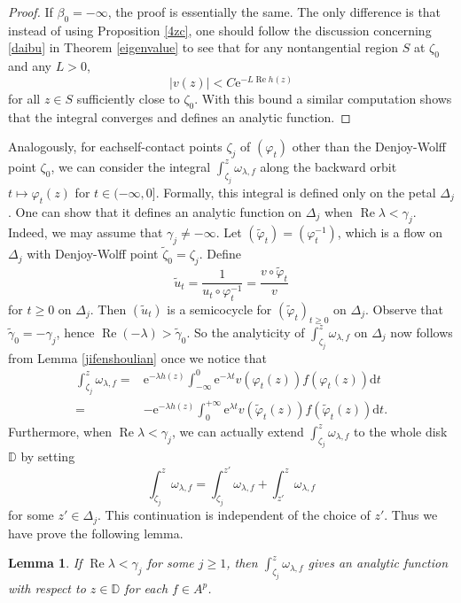 \documentclass{amsart}
\theoremstyle{proclaim}
\newtheorem{lemma}[theorem]{Lemma}
\theoremstyle{fancyproclaim}
\theoremstyle{definition}
\theoremstyle{fancystatement}
\numberwithin{equation}{section}
\begin{document}
\begin{proof}
If $\beta_0=-\infty$, the proof is essentially the same. The only difference is that instead of using Proposition \ref{4zc}, one should follow the discussion concerning \eqref{daibu} in Theorem \ref{eigenvalue} to see that for any nontangential region $S$ at $\zeta_0$ and any $L>0$,
$$|v(z)|<C \mathrm{e}^{-L\operatorname{Re}h(z)}$$
for all $z\in S$ sufficiently close to $\zeta_0$. With this bound a similar computation shows that the integral converges and defines an analytic function.
\end{proof}



Analogously, for eachself-contact points $\zeta_j$ of $(\varphi_t)$ other than the Denjoy-Wolff point $\zeta_0$, we can consider the integral $\int_{\zeta_j}^z\omega_{\lambda,f}$ along the backward orbit $t\mapsto \varphi_{t}(z)$ for $t\in(-\infty,0]$. Formally, this integral is defined only on the petal $\Delta_j$. One can show that it defines an analytic function on $\Delta_j$ when $\operatorname{Re}\lambda<\gamma_j$. Indeed, we may assume that $\gamma_j\ne-\infty$. Let $(\tilde{\varphi}_t)=(\varphi_t^{-1})$, which is a flow on $\Delta_j$ with Denjoy-Wolff point $\tilde{\zeta}_0=\zeta_j$. Define 
$$\tilde{u}_t=\frac{1}{u_t\circ\varphi_t^{-1}}=\frac{v\circ\tilde{\varphi}_t}{v}$$
for $t\geq 0$ on $\Delta_j$. Then $(\tilde{u}_t)$ is a semicocycle for $(\tilde{\varphi}_t)_{t\geq0}$ on $\Delta_j$. Observe that $\tilde{\gamma}_0=-\gamma_j$, hence $\operatorname{Re}(-\lambda)>\tilde{\gamma}_0$. So the analyticity of $\int_{\zeta_j}^z\omega_{\lambda,f}$ on $\Delta_j$ now follows from Lemma \ref{jifenshoulian} once we notice that
\begin{align*}
\int_{\zeta_j}^z\omega_{\lambda,f}=&\mathrm{e}^{-\lambda h(z) }\int_{-\infty}^0\mathrm{e}^{-\lambda t}v\left(\varphi_t(z)\right)f\left(\varphi_t(z)\right)\mathrm{d}t\\
=&-\mathrm{e}^{-\lambda h(z)}\int_0^{+\infty}\mathrm{e}^{\lambda t}v(\tilde{\varphi}_t(z))f(\tilde{\varphi}_t(z))\mathrm{d}t.
\end{align*}
Furthermore, when $\operatorname{Re}\lambda<\gamma_j$, we can actually extend $\int_{\zeta_j}^z\omega_{\lambda,f}$ to the whole disk $\mathbb{D}$ by setting
$$\int_{\zeta_j}^z\omega_{\lambda,f}=\int_{\zeta_j}^{z'}\omega_{\lambda,f}+\int_{z'}^z\omega_{\lambda,f}$$
for some $z'\in\Delta_j$. This continuation is independent of the choice of $z'$. Thus we have prove the following lemma.

\begin{lemma}\label{zaibianyige}
If $\operatorname{Re}\lambda<\gamma_j$ for some $j\geq 1$, then $\int^z_{\zeta_j}\omega_{\lambda,f}$ gives an analytic function with respect to $z\in\mathbb{D}$ for each $f\in A^p$.
\end{lemma}
\end{document}
